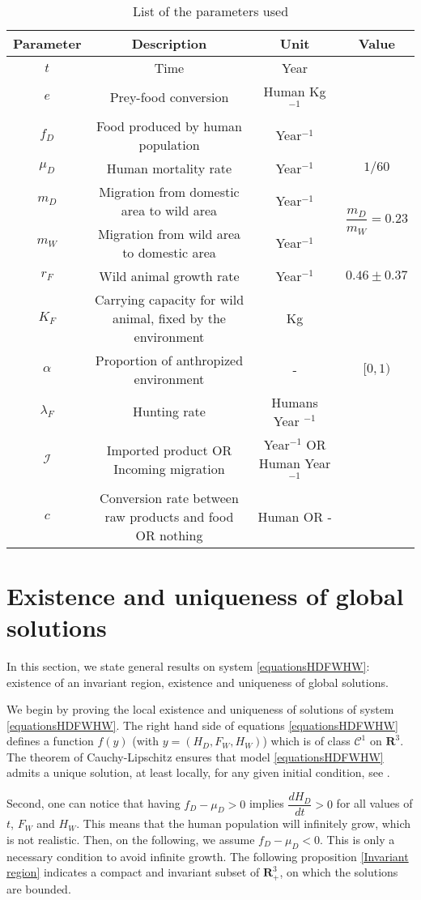 \documentclass{article}
\newcommand{\lfw}{\lambda_{F}}
\newcommand{\lfw}{\lambda_{F}}
\begin{document}
\begin{table}
\centering
\begin{tabular}{|c|c|c|c|}
\hline 
Parameter & Description & Unit & Value \\ 
\hline 
$t$ & Time & Year \\
$e$ & Prey-food conversion & Human Kg $^{-1}$ & \\
$f_D$ & Food produced by human population & Year$^{-1}$\\
$\mu_D$ & Human mortality rate  & Year$^{-1}$ & $1/60$\\
$m_D$ & Migration from domestic area to wild area & Year$^{-1}$ & \multirow{2}{*}{$\dfrac{m_D}{m_W} = 0.23$}\\
$m_W$ & Migration from wild area to domestic area & Year$^{-1}$\\
$r_F$ & Wild animal growth rate & Year$^{-1}$ & $0.46 \pm 0.37$\\
$K_F$ & Carrying capacity for wild animal, fixed by the environment& Kg\\
$\alpha$ & Proportion of anthropized environment & - & $[0, 1)$\\
$\lfw$ & Hunting rate & Humans Year $^{-1}$ \\
\hline
$\mathcal{I}$ & Imported product OR Incoming migration & Year$^{-1}$ OR Human Year$^{-1}$ \\
$c$ & Conversion rate between raw products and food OR nothing & Human OR -
\end{tabular}
\caption{List of the parameters used}
\end{table}

\section{Existence and uniqueness of global solutions}
In this section, we state general results on system \eqref{equationsHDFWHW}:  existence of an invariant region, existence and uniqueness of global solutions.

We begin by proving the local existence and uniqueness of solutions of system \eqref{equationsHDFWHW}. The right hand side of equations \eqref{equationsHDFWHW} defines a function $f(y)$ (with $y = (H_D, F_W, H_W)$) which is of class $\mathcal{C}^1$ on $\mathbf{R}^3$. The theorem of Cauchy-Lipschitz ensures that model \eqref{equationsHDFWHW} admits a unique solution, at least locally, for any given initial condition, see \cite{walter_ordinary_1998}.

Second, one can notice that having $f_D - \mu_D > 0$ implies $\dfrac{dH_D}{dt} > 0$ for all values of $t$, $F_W$ and $H_W$. This means that the human population will infinitely grow, which is not realistic. Then, on the following, we assume $f_D - \mu_D < 0$. This is only a necessary condition to avoid infinite growth. The following proposition \ref{Invariant region} indicates a compact and invariant subset of $\mathbf{R}_+^3$, on which the solutions are bounded.
\end{document}
